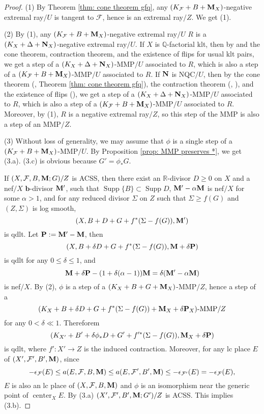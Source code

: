 \documentclass[11pt]{amsart}
\numberwithin{equation}{section}
\newcommand{\bb}{\bm{b}}
\newcommand{\Mm}{{\bf{M}}}
\newcommand{\Nn}{{\bf{N}}}
\newcommand{\Pp}{{\bf{P}}}
\newcommand{\Qq}{\mathbb{Q}}
\newcommand{\Rr}{\mathbb{R}}
\newcommand{\Center}{\operatorname{center}}
\newcommand{\Supp}{\operatorname{Supp}}
\newcommand{\Ff}{\mathcal{F}}
\theoremstyle{definition}
\theoremstyle{definition}
\theoremstyle{definition}
\begin{document}
\begin{proof}
(1) By Theorem \ref{thm: cone theorem gfq}, any $(K_{\Ff}+B+\Mm_X)$-negative extremal ray$/U$ is tangent to $\Ff$, hence is an extremal ray$/Z$. We get (1).

(2) By (1), any $(K_{\Ff}+B+\Mm_X)$-negative extremal ray$/U$ $R$ is a $(K_X+\Delta+\Nn_X)$-negative extremal ray$/U$. If $X$ is $\Qq$-factorial klt, then by \cite[Lemma 3.4]{HL22} and the cone theorem, contraction theorem, and the existence of flips for usual klt pairs, we get a step of a $(K_X+\Delta+\Nn_X)$-MMP$/U$ associated to $R$, which is also a step of a  $(K_{\Ff}+B+\Mm_X)$-MMP$/U$ associated to $R$. If $\Nn$ is NQC$/U$, then by the cone theorem (\cite[Theorem 1.3]{HL21a}, Theorem \ref{thm: cone theorem gfq}), the contraction theorem (\cite[Theorem 1.5]{Xie22}, \cite[Theorem 1.7]{CLX23}), and the existence of flips (\cite[Theorem 1.2]{LX23b}), we get a step of a $(K_{X}+\Delta+\Nn_X)$-MMP$/U$ associated to $R$, which is also a step of a  $(K_{\Ff}+B+\Mm_X)$-MMP$/U$ associated to $R$. Moreover, by (1), $R$ is a negative extremal ray$/Z$, so this step of the MMP is also a step of an MMP$/Z$.

(3) Without loss of generality, we may assume that $\phi$ is a single step of a $(K_{\Ff}+B+\Mm_X)$-MMP$/U$. By Proposition \ref{prop: MMP preserves *}, we get (3.a). (3.c) is obvious because $G'=\phi_*G$.

If $(X,\Ff,B,\Mm;G)/Z$ is ACSS, then there exist an $\Rr$-divisor $D\geq 0$ on $X$ and a nef$/X$ $\bb$-divisor $\Mm'$, such that $\Supp\{B\}\subset\Supp D$, $\Mm'-\alpha\Mm$ is nef$/X$ for some $\alpha>1$, and for any reduced divisor $\Sigma$ on $Z$ such that $\Sigma\geq f(G)$ and $(Z,\Sigma)$ is log smooth, $$(X,B+D+G+f^*(\Sigma-f(G)),\Mm')$$ is qdlt. Let $\Pp:=\Mm'-\Mm$, then $$(X,B+\delta D+G+f^*(\Sigma-f(G)),\Mm+\delta\Pp)$$ is qdlt for any $0\leq \delta\leq 1$, and 
$$\Mm+\delta\Pp-(1+\delta(\alpha-1))\Mm=\delta(\Mm'-\alpha\Mm)$$ 
is nef$/X$. By (2), $\phi$ is a step of a $(K_X+B+G+\Mm_X)$-MMP$/Z$, hence a step of a  
$$(K_X+B+\delta D+G+f^*(\Sigma-f(G))+\Mm_X+\delta\Pp_X)\text{-MMP}/Z$$
for any $0<\delta\ll 1$.
Thereforem
$$(K_{X'}+B'+\delta\phi_*D+G'+f'^*(\Sigma-f(G)),\Mm_{X}+\delta\Pp)$$ 
is qdlt, where $f': X'\rightarrow Z$ is the induced contraction. Moreover, for any lc place $E$ of $(X',\Ff',B',\Mm)$, since $$-\epsilon_{\Ff}(E)\leq a(E,\Ff,B,\Mm)\leq a(E,\Ff',B',\Mm)\leq -\epsilon_{\Ff'}(E)=-\epsilon_{\Ff}(E),$$
$E$ is also an lc place of $(X,\Ff,B,\Mm)$ and $\phi$ is an isomorphism near the generic point of $\Center_XE$. By (3.a) $(X',\Ff',B',\Mm;G')/Z$ is ACSS. This implies (3.b).


\end{proof}
\end{document}
